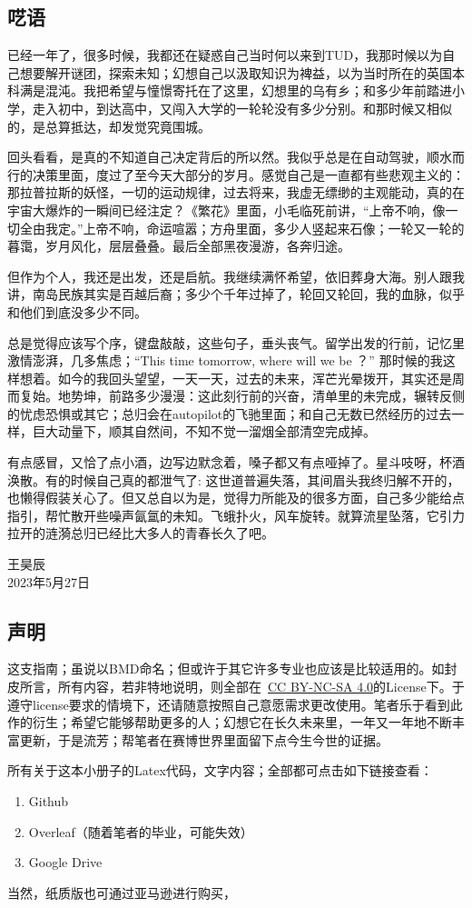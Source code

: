 \subsection{呓语}
已经一年了，很多时候，我都还在疑惑自己当时何以来到TUD，我那时候以为自己想要解开谜团，探索未知；幻想自己以汲取知识为裨益，以为当时所在的英国本科满是混沌。我把希望与憧憬寄托在了这里，幻想里的乌有乡；和多少年前踏进小学，走入初中，到达高中，又闯入大学的一轮轮没有多少分别。和那时候又相似的，是总算抵达，却发觉究竟围城。

回头看看，是真的不知道自己决定背后的所以然。我似乎总是在自动驾驶，顺水而行的决策里面，度过了至今天大部分的岁月。感觉自己是一直都有些悲观主义的：那拉普拉斯的妖怪，一切的运动规律，过去将来，我虚无缥缈的主观能动，真的在宇宙大爆炸的一瞬间已经注定？《繁花》里面，小毛临死前讲，“上帝不响，像一切全由我定。”上帝不响，命运喧嚣；方舟里面，多少人竖起来石像；一轮又一轮的暮霭，岁月风化，层层叠叠。最后全部黑夜漫游，各奔归途。

但作为个人，我还是出发，还是启航。我继续满怀希望，依旧葬身大海。别人跟我讲，南岛民族其实是百越后裔；多少个千年过掉了，轮回又轮回，我的血脉，似乎和他们到底没多少不同。

总是觉得应该写个序，键盘敲敲，这些句子，垂头丧气。留学出发的行前，记忆里激情澎湃，几多焦虑；“This time tomorrow, where will we be ？” 那时候的我这样想着。如今的我回头望望，一天一天，过去的未来，浑芒光晕拨开，其实还是周而复始。地势坤，前路多少漫漫：这此刻行前的兴奋，清单里的未完成，辗转反侧的忧虑恐惧或其它；总归会在autopilot的飞驰里面；和自己无数已然经历的过去一样，巨大动量下，顺其自然间，不知不觉一溜烟全部清空完成掉。

有点感冒，又恰了点小酒，边写边默念着，嗓子都又有点哑掉了。星斗吱呀，杯酒涣散。有的时候自己真的都泄气了: 这世道普遍失落，其间眉头我终归解不开的，也懒得假装关心了。但又总自以为是，觉得力所能及的很多方面，自己多少能给点指引，帮忙散开些噪声氤氲的未知。飞蛾扑火，风车旋转。就算流星坠落，它引力拉开的涟漪总归已经比大多人的青春长久了吧。

\vspace*{\fill}
\begin{flushright}
王昊辰\\
2023年5月27日
\end{flushright}

\newpage\subsection{声明}
这支指南；虽说以BMD命名；但或许于其它许多专业也应该是比较适用的。如封皮所言，所有内容，若非特地说明，则全部在\ccbyncsa\ \href{http://creativecommons.org/licenses/by-nc-sa/4.0/}{\uline{CC BY-NC-SA 4.0}}的License下。于遵守license要求的情境下，还请随意按照自己意愿需求更改使用。笔者乐于看到此作的衍生；希望它能够帮助更多的人；幻想它在长久未来里，一年又一年地不断丰富更新，于是流芳；帮笔者在赛博世界里面留下点今生今世的证据。

所有关于这本小册子的Latex代码，文字内容；全部都可点击如下链接查看：
\begin{enumerate}
\item Github
\item Overleaf（随着笔者的毕业，可能失效）
\item Google Drive
\end{enumerate}

当然，纸质版也可通过亚马逊进行购买，